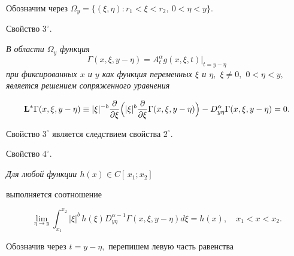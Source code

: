 \smallskip





Обозначим через $\Omega_y=\{ (\xi,\eta): r_1<\xi<r_2, \ 0<\eta<y\}.$ 







\smallskip

\hypertarget{sv3o}{}

{\small\sc Свойство  $3^\circ.$} 

{\it  В области $\Omega_y$ функция $$\Gamma(x,\xi,y-\eta)=A_{t}^{\alpha} g(x,\xi,t)\big|_{t=y-\eta}$$ при фиксированных $x$ и $y$  как функция переменных $\xi$ и $\eta,$ $\xi\neq 0,$ $0<\eta<y,$ является решением сопряженного уравнения}

$$

{\bf L}^{*}\Gamma(x,\xi,y-\eta)\equiv |\xi|^{-b}\frac{\partial}{\partial \xi}\Bigl(|\xi|^{b}\frac{\partial}{\partial \xi}

\Gamma(x,\xi,y-\eta)\Bigr)-

D^{\alpha}_{y\eta}

\Gamma(x,\xi,y-\eta)=0.

$$



\smallskip



Свойство \hyperlink{sv3o}{$3^\circ$} является следствием свойства  \hyperlink{sv2o}{$2^\circ$}.





\smallskip

\hypertarget{sv4o}{}



{\small\sc Свойство  $4^\circ.$} {\it Для любой функции $h(x)\in C[\,x_1;x_2 ]$ 

выполняется соотношение }

\begin{equation}\label{SvoystvoOfGamma}

\lim_{\eta \to y} \int _{x_1}^{x_2} |\xi|^{b}\,h(\xi) D^{\alpha-1}_{y\eta}\Gamma(x,\xi,y-\eta) d\xi=h(x), \quad  x_1 < x < x_2.

\end{equation}



\smallskip



\proof

Обозначив через $t=y-\eta,$ перепишем левую часть равенства 

